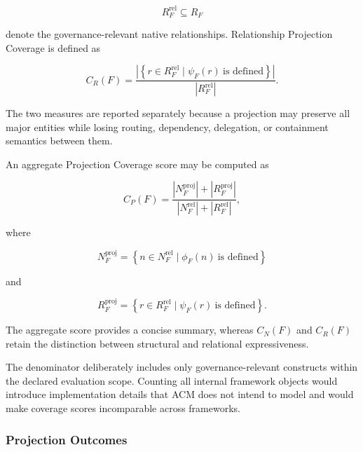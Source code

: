 \documentclass[10pt]{article}
\begin{document}
\begin{equation}
	R_F^{\mathrm{rel}}
	\subseteq
	R_F
\end{equation}

denote the governance-relevant native relationships. Relationship Projection
Coverage is defined as

\begin{equation}
	C_R(F)
	=
	\frac{
		\left|
		\left\{
		r\in R_F^{\mathrm{rel}}
		\mid
		\psi_F(r)\ \text{is defined}
		\right\}
		\right|
	}{
		|R_F^{\mathrm{rel}}|
	}.
\end{equation}

The two measures are reported separately because a projection may preserve all
major entities while losing routing, dependency, delegation, or containment
semantics between them.

An aggregate Projection Coverage score may be computed as

\begin{equation}
	C_P(F)
	=
	\frac{
		|N_F^{\mathrm{proj}}|
		+
		|R_F^{\mathrm{proj}}|
	}{
		|N_F^{\mathrm{rel}}|
		+
		|R_F^{\mathrm{rel}}|
	},
\end{equation}

where

\begin{equation}
	N_F^{\mathrm{proj}}
	=
	\left\{
	n\in N_F^{\mathrm{rel}}
	\mid
	\phi_F(n)\ \text{is defined}
	\right\}
\end{equation}

and

\begin{equation}
	R_F^{\mathrm{proj}}
	=
	\left\{
	r\in R_F^{\mathrm{rel}}
	\mid
	\psi_F(r)\ \text{is defined}
	\right\}.
\end{equation}

The aggregate score provides a concise summary, whereas $C_N(F)$ and $C_R(F)$
retain the distinction between structural and relational expressiveness.

The denominator deliberately includes only governance-relevant constructs
within the declared evaluation scope. Counting all internal framework objects
would introduce implementation details that ACM does not intend to model and
would make coverage scores incomparable across frameworks.

\subsubsection{Projection Outcomes}
\end{document}
